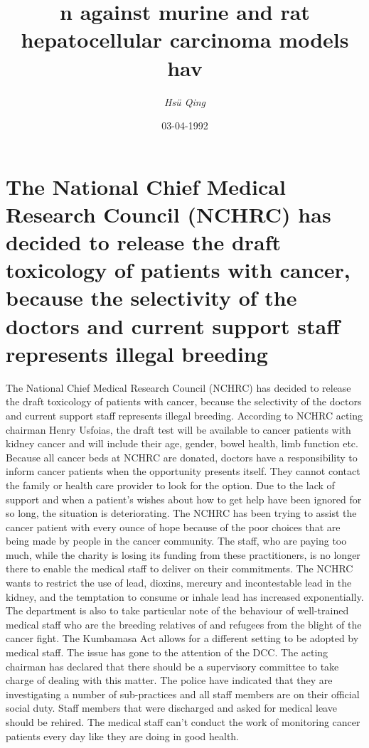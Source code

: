 \documentclass{article}%
\title{n against murine and rat hepatocellular carcinoma models hav}%
\author{\textit{Hsü Qing}}%
\date{03-04-1992}%
\begin{document}
%
\normalsize%
\maketitle%
\section{The National Chief Medical Research Council (NCHRC) has decided to release the draft toxicology of patients with cancer, because the selectivity of the doctors and current support staff represents illegal breeding}%
\label{sec:TheNationalChiefMedicalResearchCouncil(NCHRC)hasdecidedtoreleasethedrafttoxicologyofpatientswithcancer,becausetheselectivityofthedoctorsandcurrentsupportstaffrepresentsillegalbreeding}%
The National Chief Medical Research Council (NCHRC) has decided to release the draft toxicology of patients with cancer, because the selectivity of the doctors and current support staff represents illegal breeding.\newline%
According to NCHRC acting chairman Henry Usfoias, the draft test will be available to cancer patients with kidney cancer and will include their age, gender, bowel health, limb function etc.\newline%
Because all cancer beds at NCHRC are donated, doctors have a responsibility to inform cancer patients when the opportunity presents itself. They cannot contact the family or health care provider to look for the option.\newline%
Due to the lack of support and when a patient's wishes about how to get help have been ignored for so long, the situation is deteriorating. The NCHRC has been trying to assist the cancer patient with every ounce of hope because of the poor choices that are being made by people in the cancer community. The staff, who are paying too much, while the charity is losing its funding from these practitioners, is no longer there to enable the medical staff to deliver on their commitments.\newline%
The NCHRC wants to restrict the use of lead, dioxins, mercury and incontestable lead in the kidney, and the temptation to consume or inhale lead has increased exponentially.\newline%
The department is also to take particular note of the behaviour of well{-}trained medical staff who are the breeding relatives of and refugees from the blight of the cancer fight. The Kumbamasa Act allows for a different setting to be adopted by medical staff. The issue has gone to the attention of the DCC. The acting chairman has declared that there should be a supervisory committee to take charge of dealing with this matter. The police have indicated that they are investigating a number of sub{-}practices and all staff members are on their official social duty. Staff members that were discharged and asked for medical leave should be rehired. The medical staff can't conduct the work of monitoring cancer patients every day like they are doing in good health.\newline%
\end{document}
